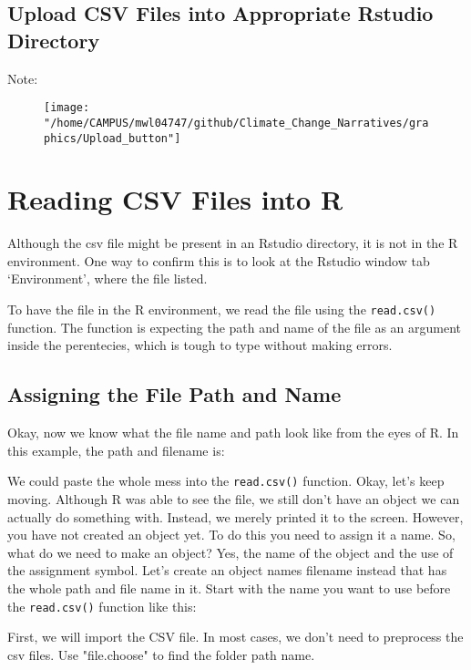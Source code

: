 \documentclass{article}\usepackage[]{graphicx}\usepackage[]{color}
\begin{document}
\subsection{Upload CSV Files into Appropriate Rstudio Directory} Note: 


\begin{figure}[h]
\texttt{[image: "/home/CAMPUS/mwl04747/github/Climate\_Change\_Narratives/graphics/Upload\_button"]}
\end{figure}


\section{Reading CSV Files into R}

Although the csv file might be present in an Rstudio directory, it is not in the R environment. One way to confirm this is to look at the Rstudio window tab `Environment', where the file listed. 

To have the file in the R environment, we read the file using the \verb!read.csv()! function. The function is expecting the path and name of the file as an argument inside the perentecies, which is tough to type without making errors. 

\subsection{Assigning the File Path and Name}

Okay, now we know what the file name and path look like from the eyes of R. In this example, the path and filename is:


We could paste the whole mess into the \texttt{read.csv()} function. Okay, let's keep moving. Although R was able to see the file, we still don't have an object we can actually do something with. Instead, we merely printed it to the screen. However, you have not created an object yet. To do this you need to assign it a name. So, what do we need to make an object?  Yes, the name of the object and the use of the assignment symbol. Let's create an object names filename instead that has the whole path and file name in it. Start with the name you want to use before the \texttt{read.csv()} function like this:

First, we will import the CSV file. In most cases, we don't need to preprocess the csv files. Use "file.choose" to find the folder path name. 
\end{document}
